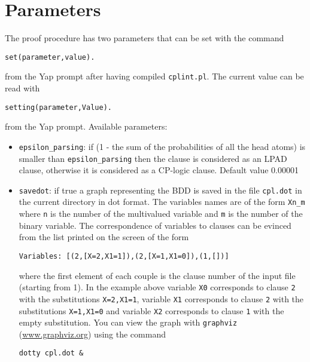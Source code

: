 \documentclass[a4paper,12pt]{article}
\begin{document}
\section{Parameters}
The proof procedure has two parameters that can be set with the command
\begin{verbatim}
set(parameter,value).
\end{verbatim}
from the Yap prompt after having compiled \texttt{cplint.pl}.
The current value can be read with
\begin{verbatim}
setting(parameter,Value).
\end{verbatim}
from the Yap prompt.
Available parameters:
\begin{itemize}
\item 
	 \verb|epsilon_parsing|: if (1 - the sum of the probabilities of all the head atoms) is smaller than 
    \verb|epsilon_parsing|
		then the clause is considered as an LPAD clause, otherwise it is considered as a CP-logic
		clause. Default value 0.00001
\item 	\texttt{savedot}: if true a graph representing the BDD is saved in the file \texttt{cpl.dot} in the current directory in dot format.
		The variables names are of the form \verb|Xn_m| where \texttt{n} is the number of the multivalued
		variable and \texttt{m} is the number of the binary variable. The correspondence of variables to 
		clauses can be evinced from the list printed on the screen of the form
\begin{verbatim}
Variables: [(2,[X=2,X1=1]),(2,[X=1,X1=0]),(1,[])]
\end{verbatim}
		where the first element of each couple is the clause number of the input file (starting from 1).
		In the example above variable \texttt{X0} corresponds to clause \texttt{2} with the substitutions \texttt{X=2,X1=1},
		variable \texttt{X1} corresponds to clause \texttt{2} with the substitutions \texttt{X=1,X1=0} and
		variable \texttt{X2} corresponds to clause \texttt{1} with the empty substitution.
		You can view the graph with \texttt{graphviz} (\href{www.graphviz.org}{www.graphviz.org}) using the
		command
\begin{verbatim}
dotty cpl.dot &
\end{verbatim}
\end{itemize}
\end{document}
